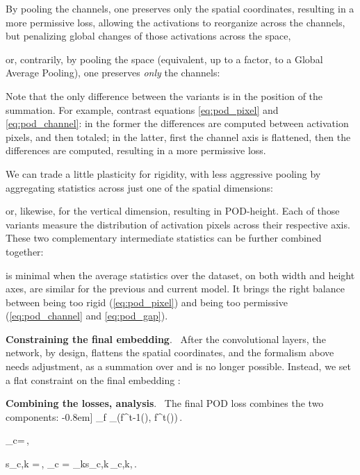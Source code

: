 \documentclass[runningheads]{llncs}
\let\thetaold\theta
\renewcommand{\theta}{\boldsymbol{\thetaold}}
\newcommand{\mcL}{\mathcal{L}}
\newcommand{\vx}{\mathbf{x}}
\newcommand{\vh}{\mathbf{h}}
\newcommand{\vy}{\mathbf{y}}
\newcommand{\vyh}{\hat\vy}
\newcommand{\parag}[1]{\vspace{0.2cm}\noindent\textbf{#1}.\ }
\begin{document}
By pooling the channels, one preserves only the spatial coordinates, resulting in a more permissive loss, allowing the activations to reorganize across the channels, but penalizing global changes of those activations across the space,

or, contrarily, by pooling the space (equivalent, up to a factor, to a Global Average Pooling), one preserves \textit{only} the channels:



Note that the only difference between the variants is in the position of the summation. For example, contrast equations \autoref{eq:pod_pixel} and \ref{eq:pod_channel}: in the former the differences are computed between activation pixels, and then totaled; in the latter, first the channel axis is flattened, then the differences are computed, resulting in a more permissive loss. 

We can trade a little plasticity for rigidity, with less aggressive pooling by aggregating statistics across just one of the spatial dimensions:

or, likewise, for the vertical dimension, resulting in POD-height. Each of those variants measure the distribution of activation pixels across their respective axis. These two complementary intermediate statistics can be further combined together:

 is minimal when the average statistics over the dataset, on both width and height axes, are similar for the previous and current model. It brings the right balance between being too rigid (\autoref{eq:pod_pixel}) and being too permissive (\autoref{eq:pod_channel} and \ref{eq:pod_gap}).

\label{sec:pod_flat}
\parag{Constraining the final embedding} After the convolutional layers, the network, by design, flattens the spatial coordinates, and the formalism above needs adjustment, as a summation over  and  is no longer possible. Instead, we set a flat constraint on the final embedding :


\parag{Combining the losses, analysis} The final POD loss combines the two  components:
-0.8em]
    \lambda_{f} \mcL_\left(f^{t-1}(\vx), f^t(\vx)\right)\,.

\vyh_{c}=\frac{\exp\left(\eta\langle\theta_{c},\vh\rangle\right)}{\sum_{i} \exp \left(\eta\langle\theta_{i}, \vh\rangle\right)}\,,

s_{c,k} =\frac{\exp\,\langle\theta_{c,k},\vh\rangle}{\sum_{i} \exp\,\langle\theta_{c,i},\vh\rangle}\,, \qquad
\vyh_c = \sum_{k}s_{c,k}\,\langle\theta_{c,k},\vh\rangle\,.
\end{document}
